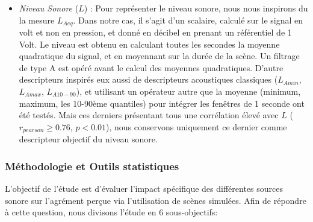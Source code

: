 \begin{itemize}
\begin{itemize}
\item \emph{Niveau Sonore} ($L$) : Pour représenter le niveau sonore, nous nous inspirons du la mesure $L_{Aeq}$. Dans notre cas, il s'agit d'un scalaire, calculé sur le signal en volt et non en pression, et donné en décibel en prenant un référentiel de 1 Volt. Le niveau est obtenu en calculant toutes les secondes la moyenne quadratique du signal, et en moyennant sur la durée de la scène. Un filtrage de type A est opéré avant le calcul des moyennes quadratiques. D'autre descripteurs inspirés eux aussi de descripteurs acoustiques classiques ($L_{Amin}$, $L_{Amax}$, $L_{A10-90}$), et utilisant un opérateur autre que la moyenne (minimum, maximum, les 10-90ème quantiles) pour intégrer les fenêtres de 1 seconde  ont été testés. Mais ces derniers présentant tous une corrélation élevé avec $L$ ($r_{pearson}\geq0.76$, $p<0.01$), nous conservons uniquement ce dernier comme descripteur objectif du niveau sonore.
\end{itemize}
\end{itemize}


\subsubsection{Méthodologie et Outils statistiques}


L'objectif de l'étude est d'évaluer l'impact spécifique des différentes sources sonore sur l'agrément perçue via l'utilisation de scènes simulées. Afin de répondre à cette question, nous divisons l'étude en 6 sous-objectifs:

